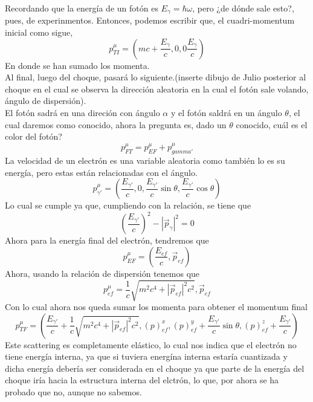 \documentclass[../main.tex]{subfiles}
\begin{document}
Recordando que la energía de un fotón es $E_\gamma=\hbar \omega$, pero ¿de dónde sale esto?, pues, de experinmentos. Entonces, podemos escribir que, el cuadri-momentum inicial como sigue,
\begin{equation*}
  p^\mu_{TI} = \left(  mc+\frac{E_\gamma}{c},0,0 \frac{E_\gamma}{c} \right)
\end{equation*}
En donde se han sumado los momenta. \\
Al final, luego del choque, pasará lo siguiente.(inserte dibujo de Julio posterior al choque en el cual se observa la dirección aleatoria en la cual el fotón sale volando, ángulo de dispersión). \\
El fotón sadrá en una direción con ángulo $\alpha$ y el fotón saldrá en un ángulo $\theta$, el cual daremos como conocido, ahora la pregunta es, dado un $\theta$ conocido, cuál es el color del fotón?  \\
\begin{equation}
  p^\mu_{FT} = p^\mu_{EF} + p^\mu_{gamma ' }
\end{equation}
La velocidad de un electrón es una variable aleatoria como también lo es su energía, pero estas están relacionadas con el ángulo.
\begin{equation*}
  p_{\gamma '}^\mu = \left(\frac{E_{\gamma '}}{c}, 0,\frac{E_{\gamma '}}{c}\sin{\theta},\frac{E_{\gamma '}}{c}\cos{\theta}\right)
\end{equation*}
Lo cual se cumple ya que, cumpliendo con la relación, se tiene que 
\begin{equation*}
  \left(\frac{E_{\gamma '}}{c}\right)^2-|\vec{p}_\gamma|^2 = 0
\end{equation*}
Ahora para la energía final del electrón, tendremos que
\begin{equation*}
  p^\mu_{EF} = \left(\frac{E_{ef}}{c},\vec{p}_{ef}\right)
\end{equation*}
Ahora, usando la relación de dispersión tenemos que
\begin{equation*}
  p^\mu_{ef} =  \frac{1}{c}\sqrt{m^2c^4+|\vec{p}_{ef}|^2c^2}, \vec{p}_{ef}
\end{equation*}
Con lo cual ahora nos queda sumar los momenta para obtener el momentum final
\begin{equation*}
  p^\mu_{TF} = \left(\frac{E_{\gamma '}}{c} + \frac{1}{c}\sqrt{m^2c^4 + |\vec{p}_{ef}|^2c^2} , (p)^x_{ef},(p)^y_{ef} + \frac{E_{\gamma '}}{c}\sin{\theta}, (p)^z_{ef}+\frac{E_{\gamma'}}{c}\right)
\end{equation*}
Este scattering es completamente elástico, lo cual nos indica que el electrón no tiene energía interna, ya que si tuviera energína interna estaría cuantizada y dicha energía debería ser considerada en el choque ya que parte de la energía del choque iría hacia la estructura interna del elctrón, lo que, por ahora se ha probado que no, aunque no sabemos.  \\
\end{document}
